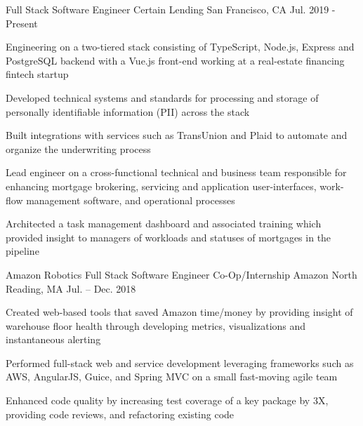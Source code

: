 

 




\begin{cventries}

  \cventry
     {Full Stack Software Engineer}
     {Certain Lending}
     {San Francisco, CA}
     {Jul. 2019 - Present}
     {
       \begin{cvitems}
			\item{Engineering on a two-tiered stack consisting of TypeScript, Node.js, Express and PostgreSQL backend with a Vue.js front-end working at a real-estate financing fintech startup}
			\item{Developed technical systems and standards for processing and storage of personally identifiable information (PII) across the stack}
			\item{Built integrations with services such as TransUnion and Plaid to automate and organize the underwriting process}
       		\item{Lead engineer on a cross-functional technical and business team responsible for enhancing mortgage brokering, servicing and application user-interfaces, work-flow management software, and operational processes}
       		\item{Architected a task management dashboard and associated training which provided insight to managers of workloads and statuses of mortgages in the pipeline}
       \end{cvitems}
     }
	 \cventry
    {Amazon Robotics Full Stack Software Engineer Co-Op/Internship} %
    {Amazon} %
    {North Reading, MA} %
    {Jul. – Dec. 2018} %
    {
    	\begin{cvitems} %
    		    \item {Created web-based tools that saved Amazon time/money by providing insight of warehouse floor health through developing metrics, visualizations and instantaneous alerting} 
    			\item {Performed full-stack web and service development leveraging frameworks such as AWS, AngularJS, Guice, and Spring MVC on a small fast-moving agile team} 
    			\item {Enhanced code quality by increasing test coverage of a key package by 3X, providing code reviews, and refactoring existing code}  			
    		 \end{cvitems}
    }


\end{cventries}
